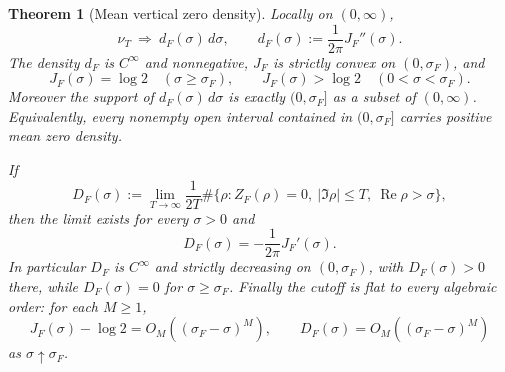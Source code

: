 \documentclass[11pt]{article}
\newtheorem{theorem}{Theorem}[section]
\theoremstyle{remark}
\newcommand{\ZF}{Z_F}
\newcommand{\Ree}{\operatorname{Re}}
\newcommand{\JF}{J_F}
\begin{document}
\begin{theorem}[Mean vertical zero density]\label{thm:jessen-density}
Locally on $(0,\infty)$,
\begin{equation}\label{eq:vague-density}
\nu_T\ \Longrightarrow\ d_F(\sigma)\,d\sigma,
\qquad
 d_F(\sigma):=\frac1{2\pi}\JF''(\sigma).
\end{equation}
The density $d_F$ is $C^\infty$ and nonnegative, $\JF$ is strictly convex on $(0,\sigma_F)$, and
\begin{equation}\label{eq:jessen-flat}
\JF(\sigma)=\log2\quad(\sigma\ge\sigma_F),
\qquad
\JF(\sigma)>\log2\quad(0<\sigma<\sigma_F).
\end{equation}
Moreover the support of $d_F(\sigma)\,d\sigma$ is exactly $(0,\sigma_F]$ as a subset of $(0,\infty)$.  Equivalently, every nonempty open interval contained in $(0,\sigma_F]$ carries positive mean zero density.

If
\[
D_F(\sigma):=
\lim_{T\to\infty}\frac1{2T}
\#\{\rho:\ZF(\rho)=0,\ |\Im\rho|\le T,\ \Ree\rho>\sigma\},
\]
then the limit exists for every $\sigma>0$ and
\begin{equation}\label{eq:cumulative-density}
D_F(\sigma)=-\frac1{2\pi}\JF'(\sigma).
\end{equation}
In particular $D_F$ is $C^\infty$ and strictly decreasing on $(0,\sigma_F)$, with $D_F(\sigma)>0$ there, while $D_F(\sigma)=0$ for $\sigma\ge\sigma_F$.
Finally the cutoff is flat to every algebraic order: for each $M\ge1$,
\begin{equation}\label{eq:flat-edge-density}
\JF(\sigma)-\log2
=O_M((\sigma_F-\sigma)^M),
\qquad
D_F(\sigma)=O_M((\sigma_F-\sigma)^M)
\end{equation}
as $\sigma\uparrow\sigma_F$.
\end{theorem}
\end{document}
